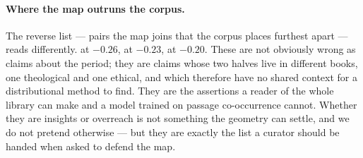 \paragraph{Where the map outruns the corpus.}
The reverse list --- pairs the map joins that the corpus places furthest apart
--- reads differently.  
 at $-0.26$,  
 at $-0.23$,  
 at $-0.20$. These are not obviously wrong as claims about
the period; they are claims whose two halves live in different books, one
theological and one ethical, and which therefore have no shared context for a
distributional method to find. They are the assertions a reader of the whole
library can make and a model trained on passage co-occurrence cannot. Whether
they are insights or overreach is not something the geometry can settle, and
we do not pretend otherwise --- but they are exactly the list a curator should
be handed when asked to defend the map.
